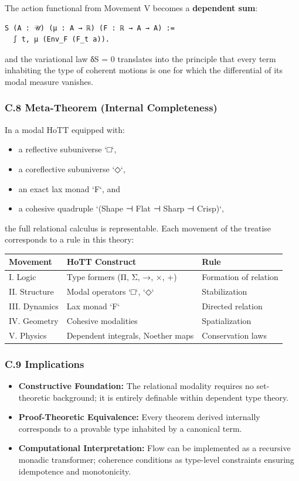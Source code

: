\documentclass[11pt]{article}
\begin{document}
The action functional from Movement V becomes a \textbf{dependent sum}:

\begin{verbatim}
S (A : 𝒰) (μ : A → ℝ) (F : ℝ → A → A) :=
  ∫ t, μ (Env_F (F_t a)).
\end{verbatim}

and the variational law δS = 0  
translates into the principle that every term inhabiting the type of coherent motions  
is one for which the differential of its modal measure vanishes.
\subsubsection*{C.8 Meta-Theorem (Internal Completeness)}
\label{sec:orgcd567b9}
In a modal HoTT equipped with:
\begin{itemize}
\item a reflective subuniverse `□`,
\item a coreflective subuniverse `◇`,
\item an exact lax monad `F`, and
\item a cohesive quadruple `(Shape ⊣ Flat ⊣ Sharp ⊣ Crisp)`,
\end{itemize}

the full relational calculus is representable.  
Each movement of the treatise corresponds to a rule in this theory:

\begin{center}
\begin{tabular}{lll}
Movement & HoTT Construct & Rule\\
\hline
I. Logic & Type formers (Π, Σ, →, ×, +) & Formation of relation\\
II. Structure & Modal operators `□`, `◇` & Stabilization\\
III. Dynamics & Lax monad `F` & Directed relation\\
IV. Geometry & Cohesive modalities & Spatialization\\
V. Physics & Dependent integrals, Noether maps & Conservation laws\\
\end{tabular}
\end{center}
\subsubsection*{C.9 Implications}
\label{sec:org37b58ab}
\begin{itemize}
\item \textbf{\textbf{Constructive Foundation:}}  The relational modality requires no set-theoretic background;  
it is entirely definable within dependent type theory.
\item \textbf{\textbf{Proof-Theoretic Equivalence:}}  Every theorem derived internally  
corresponds to a provable type inhabited by a canonical term.
\item \textbf{\textbf{Computational Interpretation:}}  Flow can be implemented as a recursive monadic transformer;  
coherence conditions as type-level constraints ensuring idempotence and monotonicity.
\end{itemize}
\end{document}
